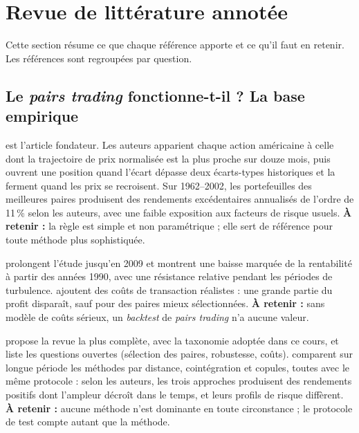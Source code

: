 \documentclass[11pt,a4paper]{article}
\begin{document}
\section{Revue de littérature annotée}

Cette section résume ce que chaque référence apporte et ce qu'il faut en retenir. Les références sont regroupées par question.

\subsection{Le \emph{pairs trading} fonctionne-t-il ? La base empirique}

\citet{gatev2006} est l'article fondateur. Les auteurs apparient chaque action américaine à celle dont la trajectoire de prix normalisée est la plus proche sur douze mois, puis ouvrent une position quand l'écart dépasse deux écarts-types historiques et la ferment quand les prix se recroisent. Sur 1962–2002, les portefeuilles des meilleures paires produisent des rendements excédentaires annualisés de l'ordre de 11\,\% selon les auteurs, avec une faible exposition aux facteurs de risque usuels. \textbf{À retenir :} la règle est simple et non paramétrique ; elle sert de référence pour toute méthode plus sophistiquée.

\citet{dofaff2010} prolongent l'étude jusqu'en 2009 et montrent une baisse marquée de la rentabilité à partir des années 1990, avec une résistance relative pendant les périodes de turbulence. \citet{dofaff2012} ajoutent des coûts de transaction réalistes : une grande partie du profit disparaît, sauf pour des paires mieux sélectionnées. \textbf{À retenir :} sans modèle de coûts sérieux, un \emph{backtest} de \emph{pairs trading} n'a aucune valeur.

\citet{krauss2017survey} propose la revue la plus complète, avec la taxonomie adoptée dans ce cours, et liste les questions ouvertes (sélection des paires, robustesse, coûts). \citet{rad2016} comparent sur longue période les méthodes par distance, cointégration et copules, toutes avec le même protocole : selon les auteurs, les trois approches produisent des rendements positifs dont l'ampleur décroît dans le temps, et leurs profils de risque diffèrent. \textbf{À retenir :} aucune méthode n'est dominante en toute circonstance ; le protocole de test compte autant que la méthode.
\end{document}
